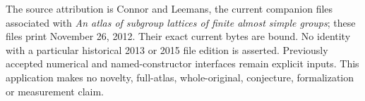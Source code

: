 \documentclass[11pt]{article}
\begin{document}
The source attribution is Connor and Leemans, the current companion files
associated with \emph{An atlas of subgroup lattices of finite almost simple
groups}; these files print November 26, 2012. Their exact current bytes are
bound. No identity with a particular historical 2013 or 2015 file edition
is asserted. Previously accepted numerical and named-constructor interfaces
remain explicit inputs. This application makes no novelty, full-atlas,
whole-original, conjecture, formalization or measurement claim.
\end{document}
